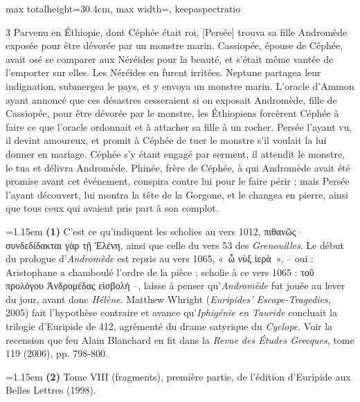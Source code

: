 \documentclass[11pt,twoside]{book}
\newcommand{\italique}[1]{\textit{#1}}
\begin{document}
\begin{adjustbox}{max totalheight=30.4cm, max width=\textwidth, keepaspectratio}
\begin{minipage}{\textwidth}
{\begin{multicols}{3}
{Parvenu en Éthiopie, dont Céphée était roi, [Persée] trouva sa fille Andromède exposée pour être dévorée par un monstre marin. Cassiopée, épouse de Céphée, avait osé se comparer aux Néréides pour la beauté, et s'était même vantée de l'emporter sur elles. Les Néréides en furent irritées. Neptune partagea leur indignation, submergea le pays, et y envoya un monstre marin. L'oracle d'Ammon ayant annoncé que ces désastres cesseraient si on exposait Andromède, fille de Cassiopée, pour être dévorée par le monstre, les Éthiopiens forcèrent Céphée à faire ce que l'oracle ordonnait et à attacher sa fille à un rocher. Persée l'ayant vu, il devint amoureux, et promit à Céphée de tuer le monstre s'il voulait la lui donner en mariage. Céphée s'y étant engagé par serment, il attendit le monstre, le tua et délivra Andromède. Phinée, frère de Céphée, à qui Andromède avait été promise avant cet événement, conspira contre lui pour le faire périr ; mais Persée l'ayant découvert, lui montra la tête de la Gorgone, et le changea en pierre, ainsi que tous ceux qui avaient pris part à son complot.}
\par\vspace{1.5pt}
\par\vspace{1.2pt}\par\nopagebreak\vspace{1pt}\noindent\hangindent=1.15em {\color{sepiaNote}\textbf{(1)}} C'est ce qu'indiquent les scholies au vers 1012, πιθανῶς· συνδεδίδακται γὰρ τῇ Ἑλένη, ainsi que celle du vers 53 des \italique{Grenouilles}. Le début du prologue d'\italique{Andromède} est repris au vers 1065, «~ὦ νὺξ ἱερὰ~», -- oui : Aristophane a chamboulé l'ordre de la pièce ; scholie à ce vers 1065 : τοῦ προλόγου Ἀνδρομέδας εἰσβολή --, laisse à penser qu'\italique{Andromède} fut jouée au lever du jour, avant donc \italique{Hélène}. Matthew Whright (\italique{Euripides' Escape-Tragedies}, 2005) fait l'hypothèse contraire et avance qu'\italique{Iphigénie en Tauride} concluait la trilogie d'Euripide de 412, agrémenté du drame satyrique du \italique{Cyclope}. Voir la recension que feu Alain Blanchard en fit dans la \italique{Revue des Études Grecques}, tome 119 (2006), pp. 798-800.
\par\vspace{1.5pt}
\noindent\hangindent=1.15em {\color{sepiaNote}\textbf{(2)}} Tome VIII (fragments), première partie, de l'édition d'Euripide aux Belles Lettres (1998).

\end{multicols}}
\end{minipage}
\end{adjustbox}
\end{document}
